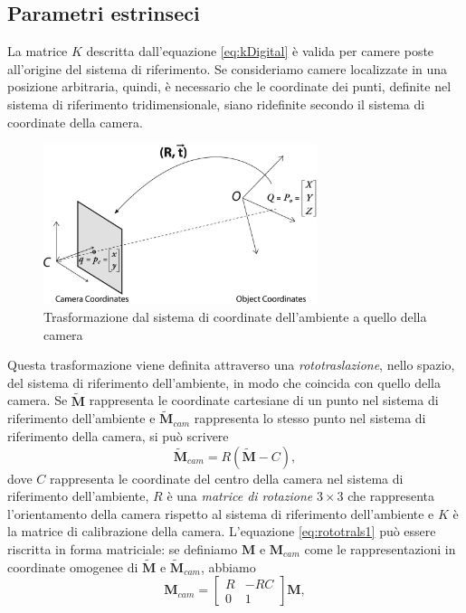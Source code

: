  \subsection{Parametri estrinseci}
 La matrice $K$ descritta dall'equazione \eqref{eq:kDigital} \`e valida per camere poste all'origine del sistema di riferimento.
Se consideriamo camere localizzate in una posizione arbitraria, quindi, \`e necessario che le coordinate dei punti, definite nel sistema di riferimento tridimensionale, siano ridefinite secondo il sistema di coordinate della camera.
 \begin{figure}
 	\centering
 	\includegraphics[width=8cm]{./pictures/rt}
 	\caption{Trasformazione dal sistema di coordinate dell'ambiente a quello della camera}
 	\label{fig:rt}
 \end{figure}
Questa trasformazione viene definita attraverso una \textit{rototraslazione}, nello spazio, del sistema di riferimento dell'ambiente, in modo che coincida con quello della camera.
Se $\tilde{\textbf{M}}$ rappresenta le coordinate cartesiane di un punto nel sistema di riferimento dell'ambiente e $\tilde{\textbf{M}}_{cam}$ rappresenta lo stesso punto nel sistema di riferimento della camera, si pu\`o scrivere
\begin{equation}
\label{eq:rototrals1}
\tilde{\textbf{M}}_{cam}=R(\tilde{\textbf{M}} - C),
\end{equation}
dove $C$ rappresenta le coordinate del centro della camera nel sistema di riferimento dell'ambiente, $R$ \`e una \textit{matrice di rotazione} $3 \times 3$ che rappresenta l'orientamento della camera rispetto al sistema di riferimento dell'ambiente e $K$ \`e la matrice di calibrazione della camera.
L'equazione \eqref{eq:rototrals1} pu\`o essere riscritta in forma matriciale: se definiamo $\textbf{M}$ e $\textbf{M}_{cam}$ come le rappresentazioni in coordinate omogenee di $\tilde{\textbf{M}}$ e $\tilde{\textbf{M}}_{cam}$, abbiamo
\[ \textbf{M}_{cam} =  \left[\begin{array}{cc}
R & -RC \\
0 & 1
\end{array}\right] 
\textbf{M}, \]

